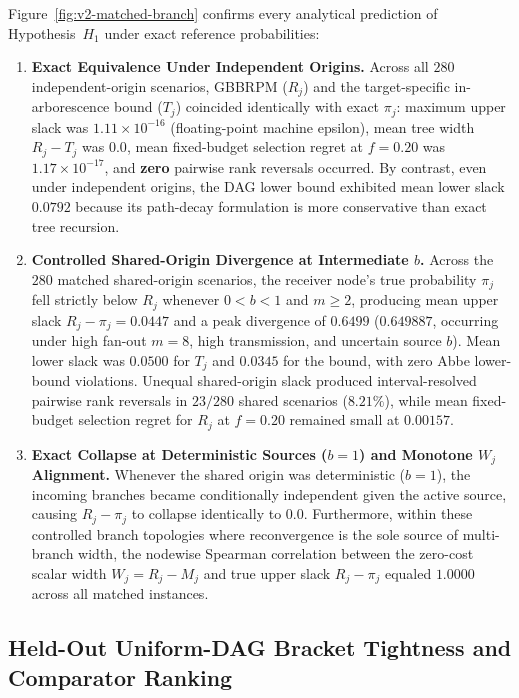 Figure~\ref{fig:v2-matched-branch} confirms every analytical prediction
of Hypothesis~$H_1$ under exact reference probabilities:
\begin{enumerate}[label=\arabic*.,leftmargin=*]
\item \textbf{Exact Equivalence Under Independent Origins.} Across all
$280$ independent-origin scenarios, GBBRPM ($R_j$) and the
target-specific in-arborescence bound ($T_j$) coincided identically with
exact $\pi_j$: maximum upper slack was $1.11 \times 10^{-16}$
(floating-point machine epsilon), mean tree width $R_j - T_j$ was $0.0$,
mean fixed-budget selection regret at $f=0.20$ was $1.17 \times 10^{-17}$,
and \textbf{zero} pairwise rank reversals occurred. By contrast, even
under independent origins, the \citet{abbe2020} DAG lower bound
exhibited mean lower slack $0.0792$ because its path-decay formulation
is more conservative than exact tree recursion.
\item \textbf{Controlled Shared-Origin Divergence at Intermediate $b$.}
Across the $280$ matched shared-origin scenarios, the receiver node's
true probability $\pi_j$ fell strictly below $R_j$ whenever $0 < b < 1$
and $m \ge 2$, producing mean upper slack $R_j - \pi_j = 0.0447$ and a
peak divergence of $0.6499$ ($0.649887$, occurring under high fan-out
$m=8$, high transmission, and uncertain source $b$). Mean lower slack
was $0.0500$ for $T_j$ and $0.0345$ for the \citet{abbe2020} bound,
with zero Abbe lower-bound violations. Unequal shared-origin slack
produced interval-resolved pairwise rank reversals in $23/280$ shared
scenarios ($8.21\%$), while mean fixed-budget selection regret for $R_j$
at $f=0.20$ remained small at $0.00157$.
\item \textbf{Exact Collapse at Deterministic Sources ($b = 1$) and
Monotone $W_j$ Alignment.} Whenever the shared origin was deterministic
($b = 1$), the incoming branches became conditionally independent
given the active source, causing $R_j - \pi_j$ to collapse identically
to $0.0$. Furthermore, within these controlled branch topologies where
reconvergence is the sole source of multi-branch width, the nodewise
Spearman correlation between the zero-cost scalar width
$W_j = R_j - M_j$ and true upper slack $R_j - \pi_j$ equaled
$1.0000$ across all matched instances.
\end{enumerate}

\subsection{Held-Out Uniform-DAG Bracket Tightness and Comparator Ranking}
\label{sec:v2-tightness-ranking}

